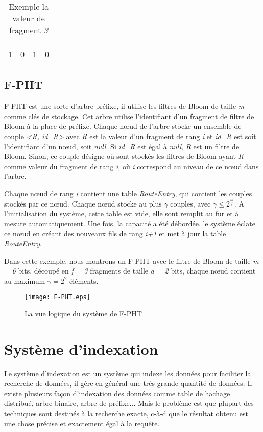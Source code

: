 \documentclass[a4paper,11pt]{report}
\begin{document}
	\begin{table}[!h]
		\centering
		\begin{tabular}{|l|c|c|r|}
		\multicolumn{1}{c}{}&\multicolumn{1}{c}{}&\multicolumn{1}{c}{}\\
		\hline
			1 & 0 & 1 & 0 \\
		\hline
		\end{tabular}
		\caption{Exemple la valeur de fragment \textit{3}}
		\label{fragement/exemple2}
	\end{table}
	
\section{F-PHT}
	F-PHT est une sorte d'arbre préfixe, il utilise  les filtres de Bloom  de taille \textit{m} comme clés de stockage. Cet arbre utilise l'identifiant d'un fragment de filtre de Bloom à la place de préfixe. Chaque nœud de l'arbre stocke un ensemble de couple \textit{<R, id\_R>} avec \textit{R} est la valeur d'un fragment de rang \textit{i} et \textit{id\_R} est soit l'identifiant d'un nœud, soit \textit{null}. Si \textit{id\_R} est égal à \textit{null}, \textit{R} est un filtre de Bloom. Sinon, ce couple désigne où sont stockés les filtres de Bloom ayant \textit{R} comme valeur du fragment de rang \textit{i}, où \textit{i} correspond au niveau de ce nœud dans l'arbre.

	Chaque nœud de rang \textit{i} contient une table \textit{RouteEntry}, qui contient les couples stockés par ce nœud. Chaque nœud stocke au plus $\gamma$ couples, avec $\gamma \leq 2^{\frac{m}{f}}$. A l'initialisation du système, cette table est vide, elle sont remplit au fur et à mesure automatiquement. Une fois, la capacité a été débordée, le système éclate ce nœud en créant des nouveaux fils de rang \textit{i+1} et met à jour la table \textit{RouteEntry}.
	
	Dans cette exemple, nous montrons un F-PHT avec le filtre de Bloom de taille \textit{m = 6} bits, découpé en \textit{f = 3} fragments de taille \textit{a = 2} bits, chaque nœud contient au maximum $\gamma = 2^{2}$ éléments.
	
	\begin{figure}[!htbp]
	\centering
	\texttt{[image: F-PHT.eps]}
	\caption{La vue logique du système de F-PHT}
	\label{F-PHT}
	\end{figure}	
	
\chapter{Système d'indexation}
	Le système d'indexation est un système qui indexe les données pour faciliter la recherche de données, il gère en général une très grande quantité de données. Il existe plusieurs façon d'indexation des données comme table de hachage distribué, arbre binaire, arbre de préfixe... Mais le problème est que plupart des techniques sont destinés à la recherche exacte, c-à-d que le résultat obtenu est une chose précise et exactement égal à la requête.
	
\end{document}
